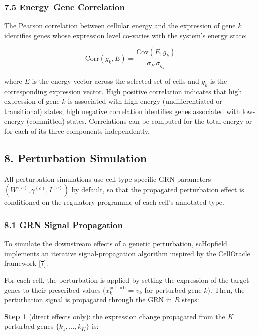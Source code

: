 \documentclass[11pt]{article}
\begin{document}
\subsubsection*{7.5 Energy--Gene Correlation}

The Pearson correlation between cellular energy and the expression of gene $k$ identifies genes whose expression level co-varies with the system's energy state:


\begin{equation}
\mathrm{Corr}(g_k, E) = \frac{\mathrm{Cov}(E, g_k)}{\sigma_E\,\sigma_{g_k}} 
\end{equation}


where $E$ is the energy vector across the selected set of cells and $g_k$ is the corresponding expression vector. High positive correlation indicates that high expression of gene $k$ is associated with high-energy (undifferentiated or transitional) states; high negative correlation identifies genes associated with low-energy (committed) states. Correlations can be computed for the total energy or for each of its three components independently.



\subsection*{8. Perturbation Simulation}

All perturbation simulations use cell-type-specific GRN parameters $(W^{(c)}, \gamma^{(c)}, I^{(c)})$ by default, so that the propagated perturbation effect is conditioned on the regulatory programme of each cell's annotated type.


\subsubsection*{8.1 GRN Signal Propagation}

To simulate the downstream effects of a genetic perturbation, scHopfield implements an iterative signal-propagation algorithm inspired by the CellOracle framework [7].

For each cell, the perturbation is applied by setting the expression of the target genes to their prescribed values ($x_k^{\text{perturb}} = v_k$ for perturbed gene $k$). Then, the perturbation signal is propagated through the GRN in $R$ steps:

\textbf{Step 1} (direct effects only): the expression change propagated from the $K$ perturbed genes $\{k_1,\ldots,k_K\}$ is:
\end{document}
